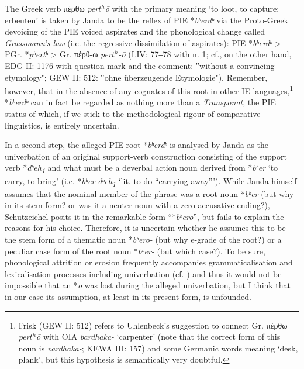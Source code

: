 \documentclass[output=paper,colorlinks,citecolor=brown]{langscibook}
\begin{document}
The Greek verb πέρθω \textit{per$t^h$ō} with the primary meaning ‘to loot, to capture; erbeuten’ is taken by Janda to be the reflex of PIE *\textit{bʰerdʰ} via the Proto-Greek devoicing of the PIE voiced aspirates and the phonological change called \textit{Grassmann’s law} (i.e. the regressive dissimilation of aspirates): PIE *\textit{bʰerdʰ} > PGr. *\textit{pʰertʰ} > Gr. πέρθ-ω \textit{per$t^h$-ō} (LIV: 77‒78 with n. 1; cf., on the other hand, EDG II: 1176 with question mark and the comment: ‟without a convincing etymology"; GEW II: 512: ‟ohne überzeugende Etymologie"). Remember, however, that in the absence of any cognates of this root in other IE languages,\footnote{Frisk (GEW II: 512) refers to Uhlenbeck’s suggestion to connect Gr. πέρθω \textit{per$t^h$ō} with OIA \textit{bardhaka-} ‘carpenter’ (note that the correct form of this noun is \textit{vardhaka-}; KEWA III: 157) and some Germanic words meaning ‘desk, plank’, but this hypothesis is semantically very doubtful.}        *\textit{bʰerdʰ} can in fact be regarded as nothing more than a \textit{Transponat}, the PIE status of which, if we stick to the methodological rigour of comparative linguistics, is entirely uncertain.

In a second step, the alleged PIE root *\textit{bʰerdʰ} is analysed by Janda as the univerbation of an original support-verb construction consisting of the support verb *\textit{dʰeh\textsubscript{1}} and what must be a deverbal action noun derived from *\textit{bʰer} ‘to carry, to bring’ (i.e. *\textit{bʰer dʰeh\textsubscript{1}} ‘lit. to do “carrying away”’). While Janda himself assumes that the nominal member of the phrase was a root noun *\textit{bʰer} (but why in its stem form? or was it a neuter noun with a zero accusative ending?), Schutzeichel posits it in the remarkable form “*\textit{bʰero}”, but fails to explain the reasons for his choice. Therefore, it is uncertain whether he assumes this to be the stem form of a thematic noun *\textit{bʰero-} (but why e-grade of the root?) or a peculiar case form of the root noun *\textit{bʰer-} (but which case?). To be sure, phonological attrition or erosion frequently accompanies grammaticalisation and lexicalisation processes including univerbation (cf. \citealt[22--23]{Balles2006}) and thus it would not be impossible that an *\textit{o} was lost during the alleged univerbation, but I think that in our case its assumption, at least in its present form, is unfounded.
\end{document}
